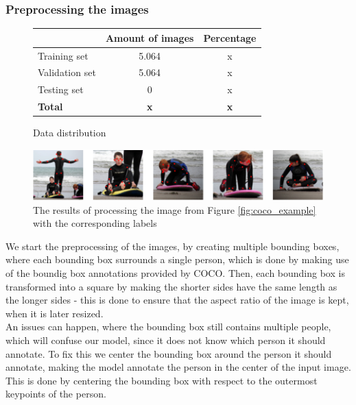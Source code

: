 \documentclass[main.tex]{subfiles}
\begin{document}
\subsubsection{Preprocessing the images}
\begin{figure}[H]
    \centering
    \begin{tabular}{l|c|c}
         & Amount of images & Percentage \\
        \hline
        Training set & 5.064 & x \\
        \hline
        Validation set & 5.064 & x \\
        \hline
        Testing set & 0 & x \\
        \hline
        \hline
        \textbf{Total} & \textbf{x} & \textbf{x} \\
        \hline
    \end{tabular}
    \caption{Data distribution}
    \label{tab:data_distribution}
\end{figure}
\begin{figure}[H]
    \centering
    \includegraphics[width = \textwidth - 2 cm]{../entities/crop_img.PNG}
    \caption{The results of processing the image from Figure \ref{fig:coco_example} with the corresponding labels}
    \label{fig:crop_img}
\end{figure}
We start the preprocessing of the images, by creating multiple bounding boxes, where each bounding box surrounds a single person, which is done by making use of the boundig box annotations provided by COCO. Then, each bounding box is transformed into a square by making the shorter sides have the same length as the longer sides - this is done to ensure that the aspect ratio of the image is kept, when it is later resized. \\
An issues can happen, where the bounding box still contains multiple people, which will confuse our model, since it does not know which person it should annotate. To fix this we center the bounding box around the person it should annotate, making the model annotate the person in the center of the input image. This is done by centering the bounding box with respect to the outermost keypoints of the person. \\
\end{document}
